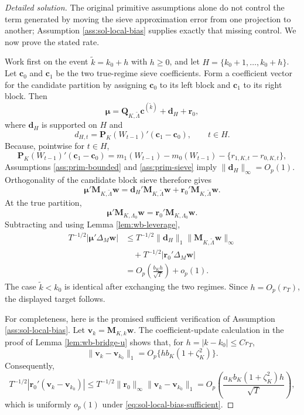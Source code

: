 \documentclass[12pt]{article}
\numberwithin{equation}{section}
\theoremstyle{definition}
\begin{document}
\begin{proof}[Detailed solution]
The original primitive assumptions alone do not control the term generated
by moving the sieve approximation error from one projection to another;
Assumption \ref{ass:sol-local-bias} supplies exactly that missing control.
We now prove the stated rate.

Work first on the event \(\widetilde k=k_0+h\) with \(h\geq0\), and let
\(H=\{k_0+1,\ldots,k_0+h\}\).  Let \(\bm c_0\) and \(\bm c_1\) be the two
true-regime sieve coefficients.  Form a coefficient vector for the candidate
partition by assigning \(\bm c_0\) to its left block and \(\bm c_1\) to its
right block.  Then
\[
    \bm\mu=\bm Q_{K,\widetilde\Lambda}\bm c^{(\widetilde k)}
            +\bm d_H+\bm r_0,
\]
where \(\bm d_H\) is supported on \(H\) and
\[
    d_{H,t}=\bm P_K(W_{t-1})'(\bm c_1-\bm c_0),
    \qquad t\in H.
\]
Because, pointwise for \(t\in H\),
\[
    \bm P_K(W_{t-1})'(\bm c_1-\bm c_0)
    =m_1(W_{t-1})-m_0(W_{t-1})
      -\{r_{1,K,t}-r_{0,K,t}\},
\]
Assumptions \ref{ass:prim-bounded} and \ref{ass:prim-sieve} imply
\(\|\bm d_H\|_\infty=O_p(1)\).  Orthogonality of the candidate block sieve
therefore gives
\[
    \bm\mu'\bm M_{K,\widetilde\Lambda}\bm w
    =\bm d_H'\bm M_{K,\widetilde\Lambda}\bm w
      +\bm r_0'\bm M_{K,\widetilde\Lambda}\bm w.
\]
At the true partition,
\[
    \bm\mu'\bm M_{K,\Lambda_0}\bm w
    =\bm r_0'\bm M_{K,\Lambda_0}\bm w.
\]
Subtracting and using Lemma \ref{lem:wb-leverage},
\begin{align*}
    T^{-1/2}|\bm\mu'\Delta_M\bm w|
    &\leq
      T^{-1/2}\|\bm d_H\|_1
      \|\bm M_{K,\widetilde\Lambda}\bm w\|_\infty\\
    &\quad+
      T^{-1/2}|\bm r_0'\Delta_M\bm w|\\
    &=O_p\left(\frac{b_Kh}{\sqrt T}\right)+o_p(1).
\end{align*}
The case \(\widetilde k<k_0\) is identical after exchanging the two regimes.
Since \(h=O_p(r_T)\), the displayed target follows.

For completeness, here is the promised sufficient verification of
Assumption \ref{ass:sol-local-bias}.  Let
\(\bm v_k=\bm M_{K,k}\bm w\).  The coefficient-update calculation in the
proof of Lemma \ref{lem:wb-bridge-u} shows that, for
\(h=|k-k_0|\leq Cr_T\),
\[
    \|\bm v_k-\bm v_{k_0}\|_1
    =O_p\{h b_K(1+\zeta_K^2)\}.
\]
Consequently,
\[
    T^{-1/2}|\bm r_0'(\bm v_k-\bm v_{k_0})|
    \leq
    T^{-1/2}\|\bm r_0\|_\infty
               \|\bm v_k-\bm v_{k_0}\|_1
    =O_p\left(
       \frac{a_Kb_K(1+\zeta_K^2)h}{\sqrt T}
      \right),
\]
which is uniformly \(o_p(1)\) under
\eqref{eq:sol-local-bias-sufficient}.
\end{proof}
\end{document}
